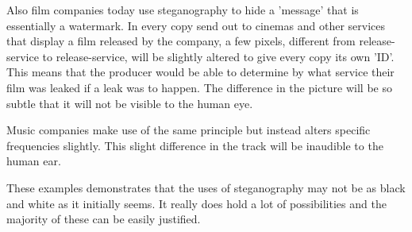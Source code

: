 Also film companies today use steganography to hide a 'message' that is essentially a watermark. In every copy send out to cinemas and other services that display a film released by the company, a few pixels, different from release-service to release-service, will be slightly altered to give every copy its own 'ID'.
This means that the producer would be able to determine by what service their film was leaked if a leak was to happen.
The difference in the picture will be so subtle that it will not be visible to the human eye.

Music companies make use of the same principle but instead alters specific frequencies slightly. This slight difference in the track will be inaudible to the human ear. \cite{Anderson1998}


These examples demonstrates that the uses of steganography may not be as black and white as it initially seems. It really does hold a lot of possibilities and the majority of these can be easily justified.

